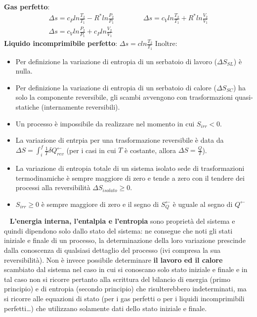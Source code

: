 \textbf{Gas perfetto}:
\[
    \begin{matrix}
        \Delta s = c_P ln \frac{T_2}{T_1} - R^* ln \frac{P_2}{P_1} \;\;\;\;\;\;\;\;\;\;\;\;\;\;\;\Delta s = c_V ln \frac{T_2}{T_1} + R^* ln \frac{V_2}{V_1}\\
        \Delta s = c_V ln \frac{P_2}{P_1} + c_P ln \frac{V_2}{V_1}
    \end{matrix}
\]
\textbf{Liquido incomprimibile perfetto}: $\Delta s = c ln \frac{T_2}{T_1}$\newline
Inoltre:
\begin{itemize}
    \item Per definizione la variazione di entropia di un serbatoio di lavoro ($\Delta S_{SL}$) è nulla.
    \item Per definizione la variazione di entropia di un serbatoio di calore ($\Delta S_{SC}$) ha solo la componente reversibile, gli scambi avvengono con trasformazioni quasi-statiche (internamente reversibili).
    \item Un processo è impossibile da realizzare nel momento in cui $S_{irr} < 0$.
    \item La variazione di entrpia per una trasformazione reversibile è data da $\Delta S = \int_{i}^f \frac{1}{T} \delta Q_{rev}^\leftarrow$ (per i casi in cui $T$ è costante, allora $\Delta S = \frac{Q}{T}$).
    \item La variazione di entropia totale di un sistema isolato sede di trasformazioni termodinamiche è
    sempre maggiore di zero e tende a zero con il tendere dei processi alla reversibilità $\Delta S_{isolato} \geq 0$.
    \item $S_{irr} \geq 0$ è sempre maggiore di zero e il segno di $S_{Q}^\leftarrow $ è uguale al segno di $Q^\leftarrow$
\end{itemize}
\ \newline
\newline
\textbf{L’energia interna, l’entalpia e l’entropia} sono proprietà del sistema e quindi dipendono solo
dallo stato del sistema: ne consegue che noti gli stati iniziale e finale di un processo, la
determinazione della loro variazione prescinde dalla conoscenza di qualsiasi dettaglio del
processo (ivi compresa la sua reversibilità). Non è invece possibile determinare \textbf{il lavoro ed il
calore} scambiato dal sistema nel caso in cui si conoscano solo stato iniziale e finale e in tal caso non si ricorre pertanto alla scrittura del bilancio di energia (primo principio) e di entropia (secondo principio) che risulterebbero
indeterminati, ma si ricorre alle equazioni di stato (per i gas perfetti o per i liquidi incomprimibili perfetti\dots) che utilizzano solamente dati dello stato iniziale e finale.
